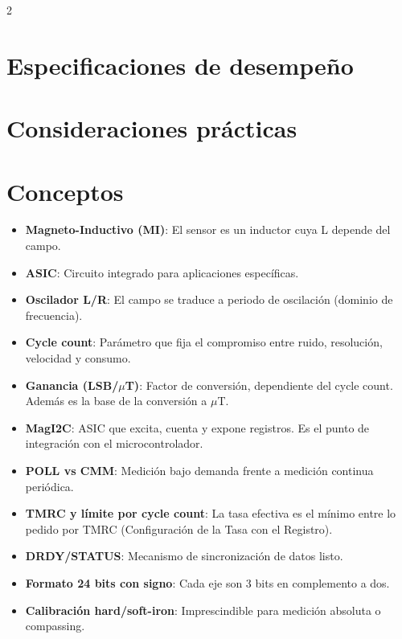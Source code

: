 \documentclass[11pt,letterpaper]{article}
\begin{document}
\begin{multicols*}{2}
\section{Especificaciones de desempeño}

\section{Consideraciones prácticas}
\section{Conceptos}
\begin{itemize}
    \item \textbf{Magneto-Inductivo (MI)}: El sensor es un inductor cuya L depende del campo.
    \item \textbf{ASIC}: Circuito integrado para aplicaciones específicas.
    \item \textbf{Oscilador L/R}: El campo se traduce a periodo de oscilación (dominio de frecuencia).
    \item \textbf{Cycle count}: Parámetro que fija el compromiso entre ruido, resolución, velocidad y consumo.
    \item \textbf{Ganancia (LSB/$\mu$T)}: Factor de conversión, dependiente del cycle count. Además es la base de la conversión a $\mu$T.
    \item \textbf{MagI2C}: ASIC que excita, cuenta y expone registros. Es el punto de integración con el microcontrolador.
    \item \textbf{POLL vs CMM}: Medición bajo demanda frente a medición continua periódica.
    \item \textbf{TMRC y límite por cycle count}: La tasa efectiva es el mínimo entre lo pedido por TMRC (Configuración de la Tasa con el Registro).
    \item \textbf{DRDY/STATUS}: Mecanismo de sincronización de datos listo.
    \item \textbf{Formato 24 bits con signo}: Cada eje son 3 bits en complemento a dos.
    \item \textbf{Calibración hard/soft-iron}: Imprescindible para medición absoluta o compassing.
\end{itemize}



\printbibliography
\end{multicols*}
\end{document}
